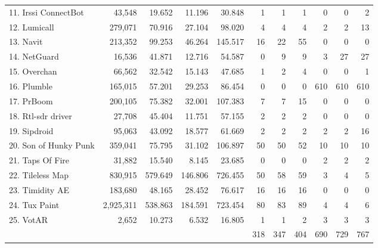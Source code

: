 \begin{table*}[t]
\begin{tabular}{@{}l|r||r|r|r||r|r|r||r|r|r@{}}
    11. Irssi ConnectBot     & 43,548    & 19.652  & 11.196  & 30.848  & 1   & 1   & 1   & 0   & 0   & 2   \\
    12. Lumicall             & 279,071   & 70.916  & 27.104  & 98.020  & 4   & 4   & 4   & 2   & 2   & 13  \\
    13. Navit                & 213,352   & 99.253  & 46.264  & 145.517 & 16  & 22  & 55  & 0   & 0   & 0   \\
    14. NetGuard             & 16,536    & 41.871  & 12.716  & 54.587  & 0   & 9   & 9   & 3   & 27  & 27  \\
    15. Overchan             & 66,562    & 32.542  & 15.143  & 47.685  & 1   & 2   & 4   & 0   & 0   & 1   \\
    16. Plumble              & 165,015   & 57.201  & 29.253  & 86.454  & 0   & 0   & 0   & 610 & 610 & 610 \\
    17. PrBoom               & 200,105   & 75.382  & 32.001  & 107.383 & 7   & 7   & 15  & 0   & 0   & 0   \\
    18. Rtl-sdr driver       & 27,708    & 45.404  & 11.751  & 57.155  & 2   & 2   & 2   & 0   & 0   & 0   \\
    19. Sipdroid             & 95,063    & 43.092  & 18.577  & 61.669  & 2   & 2   & 2   & 2   & 2   & 16  \\
    20. Son of Hunky Punk    & 359,041   & 75.795  & 31.102  & 106.897 & 50  & 50  & 52  & 10  & 10  & 10  \\
    21. Taps Of Fire         & 31,882    & 15.540  & 8.145   & 23.685  & 0   & 0   & 0   & 2   & 2   & 2   \\
    22. Tileless Map         & 830,915   & 579.649 & 146.806 & 726.455 & 50  & 58  & 59  & 3   & 4   & 5   \\
    23. Timidity AE          & 183,680   & 48.165  & 28.452  & 76.617  & 16  & 16  & 16  & 0   & 0   & 0   \\
    24. Tux Paint            & 2,925,311 & 538.863 & 184.591 & 723.454 & 80  & 83  & 89  & 4   & 4   & 6   \\
    25. VotAR                & 2,652     & 10.273  & 6.532   & 16.805  & 1   & 1   & 2   & 3   & 3   & 3   \\
    \hhline{=|=#===#=|=|=#=|=|=}
    \multicolumn{1}{l}{\textbf{Total}} & & \multicolumn{3}{c||}{}      & 318 & 347 & 404 & 690 & 729 & 767
  \end{tabular}
\end{table*}
